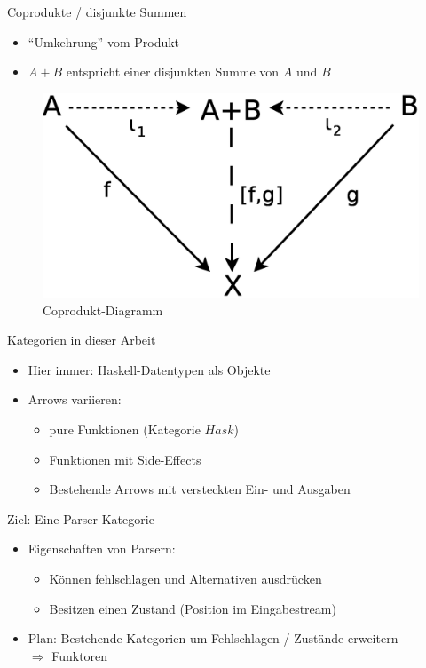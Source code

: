 \documentclass{beamer}
\begin{document}
\begin{frame}{Coprodukte / disjunkte Summen}
  \begin{itemize}
  \item "`Umkehrung"' vom Produkt
  \item $A + B$ entspricht einer disjunkten Summe von $A$ und $B$
  \end{itemize}
  \begin{figure}
    \centering
    \includegraphics[scale=0.3]{images/cat_coproduct}
    \caption{Coprodukt-Diagramm}
  \end{figure}
\end{frame}

\begin{frame}{Kategorien in dieser Arbeit}
  \begin{itemize}
  \item Hier immer: Haskell-Datentypen als Objekte
  \item Arrows variieren:
    \begin{itemize}
    \item pure Funktionen (Kategorie $Hask$)
    \item Funktionen mit Side-Effects
    \item Bestehende Arrows mit versteckten Ein- und Ausgaben
    \end{itemize}
  \end{itemize}
\end{frame}

\begin{frame}{Ziel: Eine Parser-Kategorie}
  \begin{itemize}
  \item Eigenschaften von Parsern:
    \begin{itemize}
    \item Können fehlschlagen und Alternativen ausdrücken
    \item Besitzen einen Zustand (Position im Eingabestream)
    \end{itemize}
  \item Plan: Bestehende Kategorien um Fehlschlagen / Zustände erweitern \\
  $\Rightarrow$ Funktoren
  \end{itemize}
\end{frame}
\end{document}
